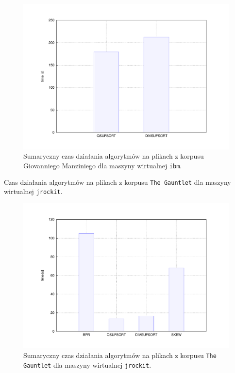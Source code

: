 \begin{figure}[p]
       \begin{center}
            \includegraphics[width=\linewidth]{figures/results/ibm-manzini.pdf}
        \end{center}        
	    \caption{Sumaryczny czas działania algorytmów na plikach z korpusu Giovanniego Manziniego dla maszyny wirtualnej \texttt{ibm}.}%
    \label{rys:ibm-manzini}
\end{figure}
 

\begin{table}[p]
	\begin{center}        
 		
    \end{center}                         
	\caption{Czas działania algorytmów na plikach z korpusu \texttt{The Gauntlet} dla maszyny wirtualnej \texttt{jrockit}.}%
    \label{tab:jrockit-gauntlet}
\end{table}

\begin{figure}[p]
       \begin{center}
            \includegraphics[width=\linewidth]{figures/results/jrockit-gauntlet.pdf}
        \end{center}        
	    \caption{Sumaryczny czas działania algorytmów na plikach z korpusu \texttt{The Gauntlet} dla maszyny wirtualnej \texttt{jrockit}.}%
    \label{rys:jrockit-gauntlet}
\end{figure} 


